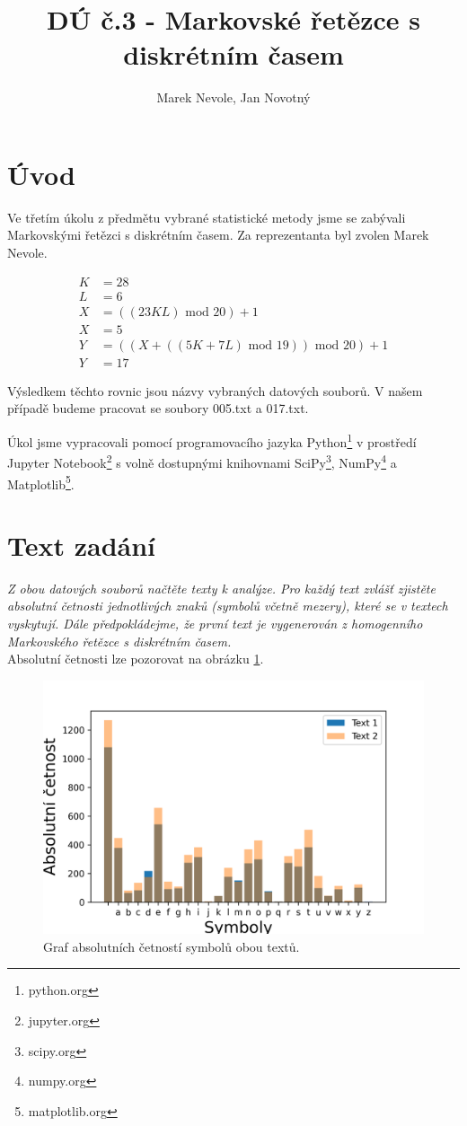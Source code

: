 \documentclass[czech]{mvi-report}
\title{DÚ č.3 - Markovské řetězce s diskrétním časem}
\author{Marek Nevole, Jan Novotný}
\affiliation{ČVUT - FIT}
\begin{document}
\maketitle

\section{Úvod}
Ve třetím úkolu z předmětu vybrané statistické metody jsme se zabývali 	Markovskými řetězci s diskrétním časem. Za reprezentanta byl zvolen Marek Nevole.

\begin{align*}
  K &= 28\\
  L &= 6\\
  X &= ((23KL)\text{ mod }20) + 1\\
  X &= 5\\
  Y &= ((X + ((5K + 7L)\text{ mod }19))\text{ mod }20) + 1\\
  Y &= 17
\end{align*}

Výsledkem těchto rovnic jsou názvy vybraných datových souborů. V našem případě budeme pracovat se soubory 005.txt a 017.txt.

Úkol jsme vypracovali pomocí programovacího jazyka Python\footnote{python.org} v prostředí Jupyter Notebook\footnote{jupyter.org} s volně dostupnými knihovnami SciPy\footnote{scipy.org}, NumPy\footnote{numpy.org} a Matplotlib\footnote{matplotlib.org}.

\section{Text zadání}
\textit{Z obou datových souborů načtěte texty k analýze. Pro každý text zvlášť zjistěte absolutní četnosti jednotlivých znaků (symbolů včetně mezery), které se v textech vyskytují. Dále předpokládejme, že první text je vygenerován z homogenního Markovského řetězce s diskrétním časem.}\\
Absolutní četnosti lze pozorovat na obrázku \ref{fig:absch}.

\begin{figure}
\includegraphics[width=\columnwidth]{img/abschdistr.png}
\caption{Graf absolutních četností symbolů obou textů.}
\label{fig:absch}
\end{figure}
\end{document}
